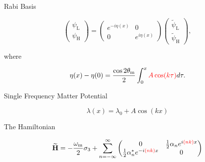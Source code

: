 \documentclass[9pt]{beamer}
\begin{document}
\begin{darkframes}
\begin{frame}{Rabi Basis}
\begin{tcolorbox}[title=A Better Basis]
\begin{equation*}
    \begin{pmatrix}
    \psi_{\mathrm{L} } \\
    \psi_{\mathrm{H} }
    \end{pmatrix} = \begin{pmatrix}
     e^{-i \eta (x)} & 0 \\  0 & e^{i \eta (x)}
    \end{pmatrix}\begin{pmatrix}
    \tilde\psi_{\mathrm{L} }\\
    \tilde\psi_{\mathrm{H} }
    \end{pmatrix},
\end{equation*}

where

\begin{equation*}
    \eta(x) - \eta(0) = \frac{\cos 2\theta_{\mathrm{m}}}{2} \int_0^x {\color{red}A\cos(k \tau)} d\tau.
\end{equation*}

\end{tcolorbox}



\end{frame}














\begin{frame}{Single Frequency Matter Potential}



\begin{equation*}
\lambda(x) = \lambda_0 +  A \cos(k x )
\end{equation*}


\begin{tcolorbox}[title=Hamiltonian in Rabi Basis]

The Hamiltonian


\begin{equation*}
\mathbf{\widetilde H}= -\frac{\omega_{\mathrm m}}{2}\sigma_3 + \sum_{n=-\infty}^{\infty} \begin{pmatrix}
0 & \frac{1}{2}  \alpha_n e^{i  {\color{red} (n k) } x}\\
\frac{1}{2}  \alpha_n^* e^{ -i  {\color{red} (n k) } x} & 0
\end{pmatrix}
\end{equation*}



\end{tcolorbox}
\end{frame}
\end{darkframes}
\end{document}
